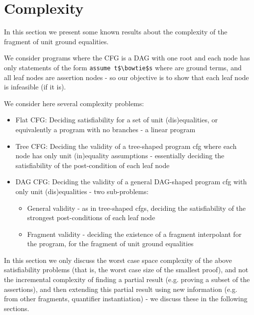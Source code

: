 \newpage
\section{Complexity}
In this section we present some known results about the complexity of the fragment of unit ground equalities.

We consider programs where the CFG is a DAG with one root and each node has only statements of the form \lstinline{assume t$\bowtie$s}  where  are ground terms, and all leaf nodes are assertion nodes - so our objective is to show that each leaf node is infeasible (if it is).

We consider here several complexity problems:
\begin{itemize}
	\item Flat CFG: Deciding satisfiability for a set of unit (dis)equalities, or equivalently a program with no branches - a linear program
	\item Tree CFG: Deciding the validity of a tree-shaped program cfg where each node has only unit (in)equality assumptions - essentially deciding the satisfiability of the post-condition of each leaf node
	\item DAG CFG: Deciding the validity of a general DAG-shaped program cfg with only unit (dis)equalities - two sub-problems:
	\begin{itemize}
		\item General validity - as in tree-shaped cfgs, deciding the satisfiability of the strongest post-conditions of each leaf node
		\item Fragment validity - deciding the existence of a fragment interpolant for the program, for the fragment of unit ground equalities
	\end{itemize}
\end{itemize}
In this section we only discuss the worst case space complexity of the above satisfiability problems (that is, the worst case size of the smallest proof), and not the incremental complexity of 
finding a partial result (e.g. proving a subset of the assertions), and then extending this partial result using new information (e.g. from other fragments, quantifier instantiation) - we discuss these in the following sections.


